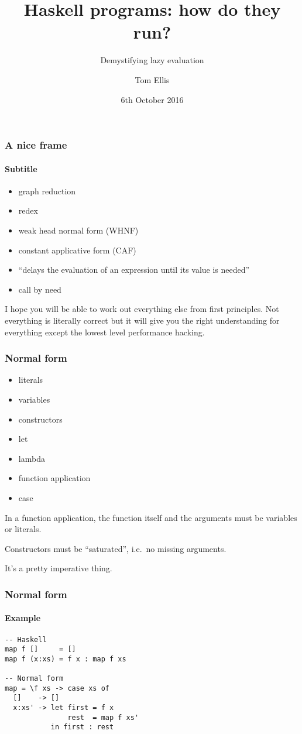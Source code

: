 \documentclass{beamer}
\title{Haskell programs: how do they run?}
\subtitle{Demystifying lazy evaluation}
\author{Tom Ellis}
\date{6th October 2016}
\begin{document}
\begin{frame}[t]
\titlepage
\end{frame}

\begin{frame}
\frametitle{A nice frame}
\framesubtitle{Subtitle}

\begin{itemize}
\item graph reduction
\item redex
\item weak head normal form (WHNF)
\item constant applicative form (CAF)
\item ``delays the evaluation of an expression until its value is needed''
\item call by need
\end{itemize}

I hope you will be able to work out everything else from first
principles.  Not everything is literally correct but it will give you
the right understanding for everything except the lowest level
performance hacking.

\end{frame}

\begin{frame}
  \frametitle{Normal form}

  \begin{itemize}
  \item literals
  \item variables
  \item constructors
  \item let
  \item lambda
  \item function application
  \item case
  \end{itemize}

  In a function application, the function itself and the arguments
  must be variables or literals.

  Constructors must be ``saturated'', i.e.\ no missing arguments.

  It's a pretty imperative thing.
\end{frame}

\begin{frame}[fragile]
  \frametitle{Normal form}
  \framesubtitle{Example}

  \begin{verbatim}
-- Haskell
map f []     = []
map f (x:xs) = f x : map f xs

-- Normal form
map = \f xs -> case xs of
  []    -> []   
  x:xs' -> let first = f x
               rest  = map f xs'
           in first : rest
  \end{verbatim}

\end{frame}
\end{document}
